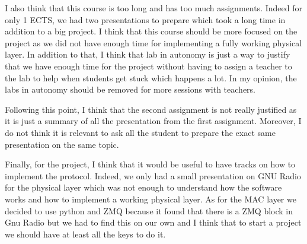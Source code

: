 I also think that this course is too long and has too much assignments. Indeed for only 1 ECTS, we had two presentations to prepare which took a long time in addition to a big project. I think that this course should be more focused on the project as we did not have enough time for implementing a fully working physical layer. In addition to that, I think that lab in autonomy is just a way to justify that we have enough time for the project without having to assign a teacher to the lab to help when students get stuck which happens a lot. In my opinion, the labs in autonomy should be removed for more sessions with teachers.
\par
Following this point, I think that the second assignment is not really justified as it is just a summary of all the presentation from the first assignment. Moreover, I do not think it is relevant to ask all the student to prepare the exact same presentation on the same topic.
\\\par

Finally, for the project, I think that it would be useful to have tracks on how to implement the protocol. Indeed, we only had a small presentation on GNU Radio for the physical layer which was not enough to understand how the software works and how to implement a working physical layer. As for the MAC layer we decided to use python and ZMQ because it found that there is a ZMQ block in Gnu Radio but we had to find this on our own and I think that to start a project we should have at least all the keys to do it.
